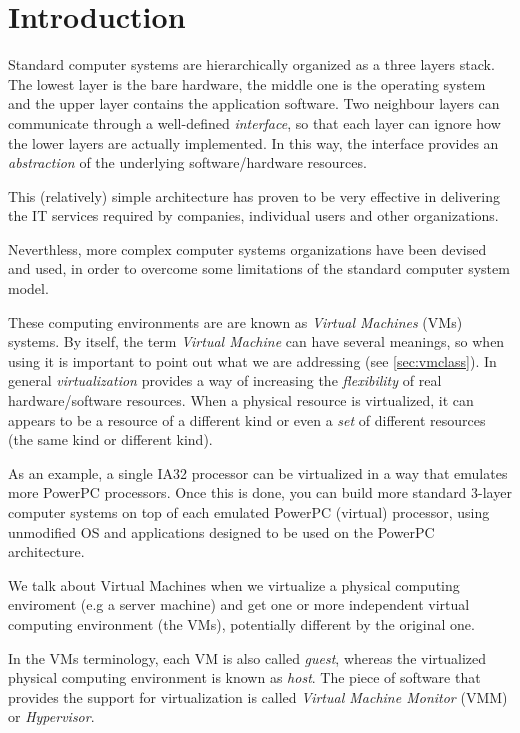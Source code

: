\chapter{Introduction}

Standard computer systems are hierarchically organized as a three
layers stack. The lowest layer is the bare hardware, the middle one is the operating system and the 
upper layer contains the application software.
Two neighbour layers can communicate through a well-defined \emph{interface}, so that each layer can ignore how the
lower layers are actually implemented. In this way, the interface provides an \emph{abstraction} of the underlying software/hardware
resources.

This (relatively) simple architecture has proven to be very effective in delivering the IT services required
by companies, individual users and other organizations.

\vspace{0.5cm}

Neverthless, more complex computer systems organizations have been devised and used, in order to overcome some limitations
of the standard computer system model.

These computing environments are are known as \emph{Virtual Machines} (VMs) systems.
By itself, the term \emph{Virtual Machine} can have several meanings, so when using it is important to point out what we are
addressing (see \ref{sec:vmclass}).
In general \emph{virtualization} provides a way of increasing the \emph{flexibility} of real hardware/software resources. When a 
physical resource is virtualized, it can appears to be a resource of a different kind or even a \emph{set} of different
resources (the same kind or different kind).

As an example, a single IA32 processor can be virtualized in a way that emulates more PowerPC processors. Once this is done, you
can build more standard 3-layer computer systems on top of each emulated PowerPC (virtual) processor, using unmodified OS and 
applications designed to be used on the PowerPC architecture.

We talk about Virtual Machines when we virtualize a physical computing enviroment (e.g a server machine) and get one or more 
independent virtual computing environment (the VMs), potentially different by the original one.

In the VMs terminology, each VM is also called \emph{guest}, whereas the virtualized physical computing environment is known as
\emph{host}.
The piece of software that provides the support for virtualization is called \emph{Virtual Machine Monitor} (VMM) or \emph{Hypervisor}.

